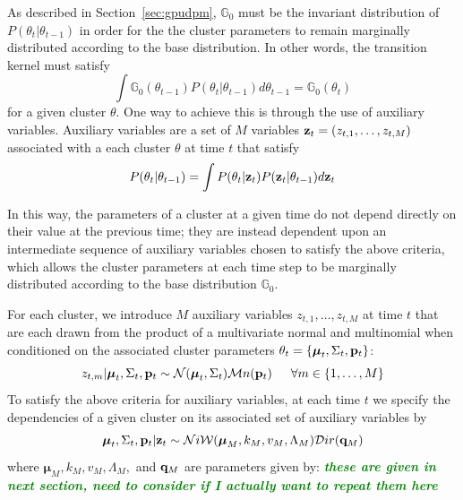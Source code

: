 \documentclass[smallcondensed, final]{svjour3}
\newcommand{\willie}[1]{\textcolor{green}{\textsf{\emph{\textbf{\textcolor{green}{#1}}}}}}
\begin{document}
As described in Section~\ref{sec:gpudpm}, $\mathbb{G}_{0}$ must be the invariant distribution of $P(\theta_{t} | \theta_{t-1})$ in order for the the cluster parameters to remain marginally distributed according to the base distribution. In other words, the transition kernel must satisfy
\begin{equation}
\int \mathbb{G}_{0}(\theta_{t-1})P(\theta_{t} | \theta_{t-1}) d\theta_{t-1} = \mathbb{G}_{0}(\theta_{t})
\end{equation}
for a given cluster $\theta$. One way to achieve this is through the use of auxiliary variables. Auxiliary variables are a set of $M$ variables $\bold{z}_{t} = (z_{t,1}, \ldots, z_{t,M})$ associated with a each cluster $\theta$ at time $t$ that satisfy
\begin{eqnarray}
P(\theta_{t} | \theta_{t-1}) = \int P(\theta_{t} | \bold{z}_{t}) P(\bold{z}_{t} | \theta_{t-1}) d \bold{z}_{t}  %
\end{eqnarray}

In this way, the parameters of a cluster at a given time do not depend directly on their value at the previous time; they are instead dependent upon an intermediate sequence of auxiliary variables chosen to satisfy the above criteria, which allows the cluster parameters at each time step to be marginally distributed according to the base distribution $\mathbb{G}_{0}$.

For each cluster, we introduce $M$ auxiliary variables $z_{t, 1}, \ldots, z_{t, M}$ at time $t$ that are each drawn from the product of a multivariate normal and multinomial when conditioned on the associated cluster parameters $\theta_{t} = \{ \boldsymbol{\mu}_{t}, \Sigma_{t}, \bold{p}_{t} \}$:
\begin{equation} \label{transker1}
z_{t, m} | \boldsymbol{\mu}_{t}, \Sigma_{t}, \bold{p}_{t}  \sim  \mathcal{N}(\boldsymbol{\mu}_{t}, \Sigma_{t}) \mathcal{M}n(\bold{p}_{t})   \hspace{15pt}   
\forall m \in \{ 1, \ldots, M \}
\end{equation}
To satisfy the above criteria for auxiliary variables, at each time $t$ we specify the dependencies of a given cluster on its associated set of auxiliary variables by
\begin{equation} \label{transker2}
\boldsymbol{\mu}_{t}, \Sigma_{t}, \bold{p}_{t} | \bold{z}_t  \sim  \mathcal{N}i\mathcal{W}(\boldsymbol{\mu}_{M}, k_{M}, v_{M}, \Lambda_{M})  \mathcal{D}ir(\bold{q}_{M})
\end{equation}
where $\boldsymbol{\mu}_{M}, k_{M}, v_{M}, \Lambda_{M},$ and $\bold{q}_{M}$ are parameters given by:
\willie{these are given in next section, need to consider if I actually want to repeat them here}
\end{document}
